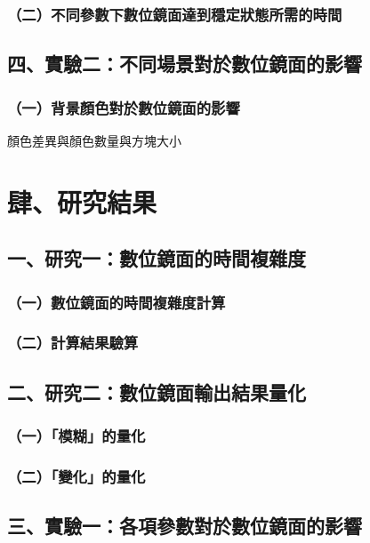\documentclass[12pt]{article}
\begin{document}
\subsubsection{（二）不同參數下數位鏡面達到穩定狀態所需的時間}

\subsection{四、實驗二：不同場景對於數位鏡面的影響}

\subsubsection{（一）背景顏色對於數位鏡面的影響}

顏色差異與顏色數量與方塊大小

\newpage

\section{肆、研究結果}

\subsection{一、研究一：數位鏡面的時間複雜度}

\subsubsection{（一）數位鏡面的時間複雜度計算}

\subsubsection{（二）計算結果驗算}

\subsection{二、研究二：數位鏡面輸出結果量化}

\subsubsection{（一）「模糊」的量化}

\subsubsection{（二）「變化」的量化}

\subsection{三、實驗一：各項參數對於數位鏡面的影響}
\end{document}
